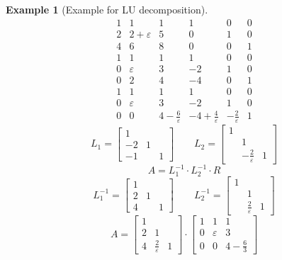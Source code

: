 \documentclass[a4paper,landscape,twocolumn]{article}
\newtheorem{ex}{Example}[section]
\begin{document}
\begin{ex}[Example for LU decomposition]
  \[
    \begin{array}{ccc|ccc}
      1 & 1 & 1 & 1 & 0 & 0 \\
      2 & 2+\varepsilon & 5 & 0 & 1 & 0 \\
      4 & 6 & 8 & 0 & 0 & 1 \\
    \hline
      1 & 1 & 1 & 1 & 0 & 0 \\
      0 & \varepsilon & 3 & -2 & 1 & 0 \\
      0 & 2 & 4 & -4 & 0 & 1 \\
    \hline
      1 & 1 & 1 & 1 & 0 & 0 \\
      0 & \varepsilon & 3 & -2 & 1 & 0 \\
      0 & 0 & 4-\frac6{\varepsilon} & -4+\frac4{\varepsilon} & -\frac2\varepsilon & 1
    \end{array}
  \] \[
    L_1 = \begin{bmatrix}
       1 &   & \\
      -2 & 1 & \\
      -1 &   & 1
    \end{bmatrix}
    \qquad
    L_2 = \begin{bmatrix}
      1 &   & \\
        & 1 & \\
        & -\frac2\varepsilon & 1
    \end{bmatrix}
  \] \[
    A = L_1^{-1} \cdot L_2^{-1} \cdot R
  \] \[
    L_1^{-1} = \begin{bmatrix}
      1 &   & \\
      2 & 1 & \\
      4 &   & 1
    \end{bmatrix} \qquad
    L_2^{-1} = \begin{bmatrix}
      1 &   & \\
        & 1 & \\
        & \frac2\varepsilon & 1
    \end{bmatrix}
  \] \[
    A = \begin{bmatrix}
      1 &   & \\
      2 & 1 & \\
      4 & \frac2{\varepsilon} & 1
    \end{bmatrix} \cdot \begin{bmatrix}
      1 & 1 & 1 \\
      0 & \varepsilon & 3 \\
      0 & 0 & 4-\frac63
    \end{bmatrix}
\]
\end{ex}
\end{document}
